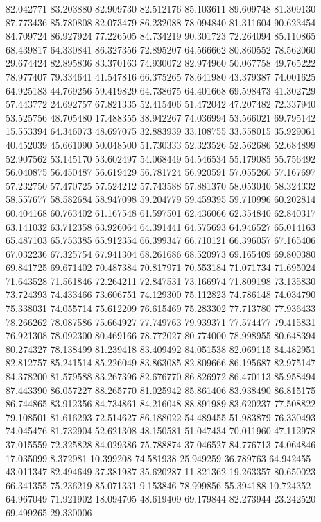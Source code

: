 82.042771
83.203880
82.909730
82.512176
85.103611
89.609748
81.309130
87.773436
85.780808
82.073479
86.232088
78.094840
81.311604
90.623454
84.709724
86.927924
77.226505
84.734219
90.301723
72.264094
85.110865
68.439817
64.330841
86.327356
72.895207
64.566662
80.860552
78.562060
29.674424
82.895836
83.370163
74.930072
82.974960
50.067758
49.765222
78.977407
79.334641
41.547816
66.375265
78.641980
43.379387
74.001625
64.925183
44.769256
59.419829
64.738675
64.401668
69.598473
41.302729
57.443772
24.692757
67.821335
52.415406
51.472042
47.207482
72.337940
53.525756
48.705480
17.488355
38.942267
74.036994
53.566021
69.795142
15.553394
64.346073
48.697075
32.883939
33.108755
33.558015
35.929061
40.452039
45.661090
50.048500
51.730333
52.323526
52.562686
52.684899
52.907562
53.145170
53.602497
54.068449
54.546534
55.179085
55.756492
56.040875
56.450487
56.619429
56.781724
56.920591
57.055260
57.167697
57.232750
57.470725
57.524212
57.743588
57.881370
58.053040
58.324332
58.557677
58.582684
58.947098
59.204779
59.459395
59.710996
60.202814
60.404168
60.763402
61.167548
61.597501
62.436066
62.354840
62.840317
63.141032
63.712358
63.926064
64.391441
64.575693
64.946527
65.014163
65.487103
65.753385
65.912354
66.399347
66.710121
66.396057
67.165406
67.032236
67.325754
67.941304
68.261686
68.520973
69.165409
69.800380
69.841725
69.671402
70.487384
70.817971
70.553184
71.071734
71.695024
71.643528
71.561846
72.264211
72.847531
73.166974
71.809198
73.135830
73.724393
74.433466
73.606751
74.129300
75.112823
74.786148
74.034790
75.338031
74.055714
75.612209
76.615469
75.283302
77.713780
77.936433
78.266262
78.087586
75.664927
77.749763
79.939371
77.574477
79.415831
76.921308
78.092300
80.469166
78.772027
80.774000
78.998955
80.648394
80.274327
78.138499
81.239418
83.409492
84.051538
82.069115
84.482951
82.812757
85.241514
85.226049
83.863085
82.809666
86.195687
82.975147
84.378200
81.579588
83.267396
82.676770
86.826972
86.470113
85.958494
87.443390
86.057227
88.265770
81.025942
85.861406
83.938490
86.815175
86.744865
83.912356
84.734861
84.216048
88.891989
83.620237
77.508822
79.108501
81.616293
72.514627
86.188022
54.489455
51.983879
76.330493
74.045476
81.732904
52.621308
48.150581
51.047434
70.011960
47.112978
37.015559
72.325828
84.029386
75.788874
37.046527
84.776713
74.064846
17.035099
8.372981
10.399208
74.581938
25.949259
36.789763
64.942455
43.011347
82.494649
37.381987
35.620287
11.821362
19.263357
80.650023
66.341355
75.236219
85.071331
9.153846
78.999856
55.394188
10.724352
64.967049
71.921902
18.094705
48.619409
69.179844
82.273944
23.242520
69.499265
29.330006
